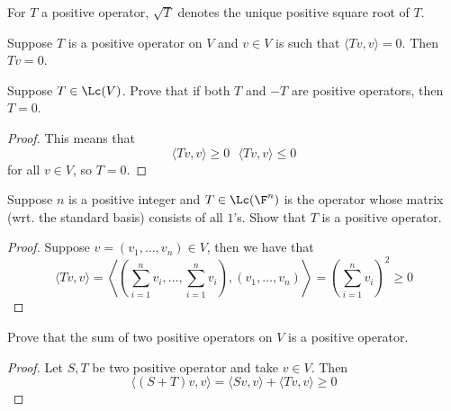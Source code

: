 \documentclass{extarticle}
\begin{document}
\begin{remark}
    For \(T\) a positive operator, \(\sqrt{T}\) denotes the unique positive square root of \(T\).
\end{remark}

\begin{corollary}
    Suppose \(T\) is a positive operator on \(V\) and \(v \in V\) is such that \(\langle Tv,v \rangle = 0\).
    Then \(Tv = 0\).
\end{corollary}


\newpage
{}

\begin{problem}{1}
    Suppose \(T \in \Lc(V)\). Prove that if both \(T\) and \(-T\) are positive operators, then
    \(T = 0\).
\end{problem}

\begin{proof}
This means that
\[\langle Tv,v \rangle \geq 0 \ \ \ \langle Tv,v \rangle \leq 0\]
for all \(v \in V\), so \(T = 0\).
\end{proof}

\begin{problem}{3}
    Suppose \(n\) is a positive integer and \(T \in \Lc(\F^n)\) is the operator whose matrix (wrt.
    the standard basis) consists of all \(1\)'s. Show that \(T\) is a positive operator.
\end{problem}

\begin{proof}
Suppose \(v = (v_1, \ldots, v_n) \in V\), then we have that
\[\langle Tv,v \rangle
= \left\langle \left(\sum_{i=1}^{n} v_i, \ldots, \sum_{i=1}^{n} v_i \right), (v_1, \ldots, v_n) \right\rangle
= \left(\sum_{i=1}^{n} v_i \right)^2 \geq 0\]
\end{proof}

\begin{problem}{6}
    Prove that the sum of two positive operators on \(V\) is a positive operator.
\end{problem}

\begin{proof}
Let \(S, T\) be two positive operator and take \(v \in V\). Then
\[\langle (S+T)v,v \rangle = \langle Sv,v \rangle + \langle Tv,v \rangle \geq 0\]
\end{proof}
\end{document}
